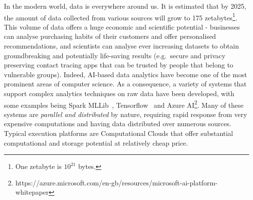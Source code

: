 \documentclass[a4paper,11pt]{article}
\begin{document}
In the modern world, data is everywhere around us. It is estimated that by 2025, the amount of data collected from various sources will grow to 175 zetabytes\footnote{One zetabyte is $10^{21}$ bytes.}. %
This volume of data offers a huge economic and scientific potential - businesses can analyse purchasing habits of their customers and offer personalised recommendations, and scientists can analyse ever increasing datasets to obtain groundbreaking and potentially life-saving results (e.g.~secure and privacy preserving contact tracing apps that can be trusted by people that belong to vulnerable groups). Indeed, AI-based data analytics have become one of the most prominent areas of computer science. As a consequence, a variety of systems that support complex analytics techniques on raw data have been developed, with some examples being Spark MLLib~\cite{mllib}, Tensorflow~\cite{tensorflow} and Azure AI\footnote{https://azure.microsoft.com/en-gb/resources/microsoft-ai-platform-whitepaper}. Many of these systems are \emph{parallel and distributed} by nature, requiring rapid  response from very expensive computations and having data distributed over numerous sources. Typical execution platforms are Computational Clouds that offer substantial computational and storage potential at relatively cheap price. 
%
\end{document}
